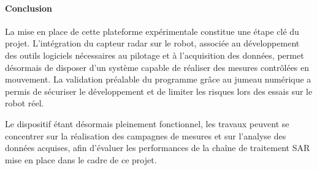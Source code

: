 \paragraph*{Conclusion}

La mise en place de cette plateforme expérimentale constitue une étape clé du projet. L’intégration du capteur radar sur le robot, associée au développement des outils logiciels nécessaires au pilotage et à l’acquisition des données, permet désormais de disposer d’un système capable de réaliser des mesures contrôlées en mouvement. La validation préalable du programme grâce au jumeau numérique a permis de sécuriser le développement et de limiter les risques lors des essais sur le robot réel.

Le dispositif étant désormais pleinement fonctionnel, les travaux peuvent se concentrer sur la réalisation des campagnes de mesures et sur l’analyse des données acquises, afin d’évaluer les performances de la chaîne de traitement SAR mise en place dans le cadre de ce  projet.